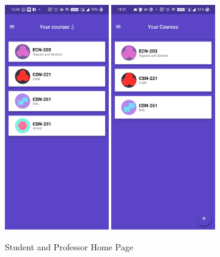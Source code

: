 \documentclass{article}
\begin{document}
\begin{figure}[H]
    \centering
    \includegraphics[width=0.40\textwidth]{StudentsCourses.jpg}
    \includegraphics[width=0.40\textwidth]{ProfCourses.jpg}
    \caption{Student and Professor Home Page}
    \label{fig:StPrCourses}
\end{figure}
\end{document}
